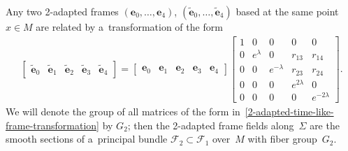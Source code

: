 \documentclass[10pt,a4paper]{amsart}
\numberwithin{equation}{section}
\theoremstyle{definition}
\begin{document}
Any two 2-adapted frames $(\mathbf{e}_0, \ldots, \mathbf{e}_4)$, $(\tilde{\mathbf{e}}_0, \ldots, \tilde{\mathbf{e}}_4)$
based at the same point $x \in M$ are related by a~transformation of the form
\begin{gather}
\begin{bmatrix}
\tilde{\mathbf{e}}_0 & \tilde{\mathbf{e}}_1 & \tilde{\mathbf{e}}_2 & \tilde{\mathbf{e}}_3 & \tilde{\mathbf{e}}_4
\end{bmatrix}
=
\begin{bmatrix}
\mathbf{e}_0 & \mathbf{e}_1 & \mathbf{e}_2 & \mathbf{e}_3 & \mathbf{e}_4
\end{bmatrix}
\begin{bmatrix}
1 & 0 & 0 & 0 & 0
\\
0 & e^{\lambda} & 0 & r_{13} & r_{14}
\\
0 & 0 & e^{-\lambda} & r_{23} & r_{24}
\\
0 & 0 & 0 & e^{2\lambda} & 0
\\
0 & 0 & 0 & 0 & e^{-2\lambda}
\end{bmatrix}.
\label{2-adapted-time-like-frame-transformation}
\end{gather}
We will denote the group of all matrices of the form in~\eqref{2-adapted-time-like-frame-transformation} by $G_2$; then
the 2-adapted frame f\/ields along~$\Sigma$ are the smooth sections of a~principal bundle $\mathcal{F}_2 \subset
\mathcal{F}_1$ over~$M$ with f\/iber group~$G_2$.
\end{document}
